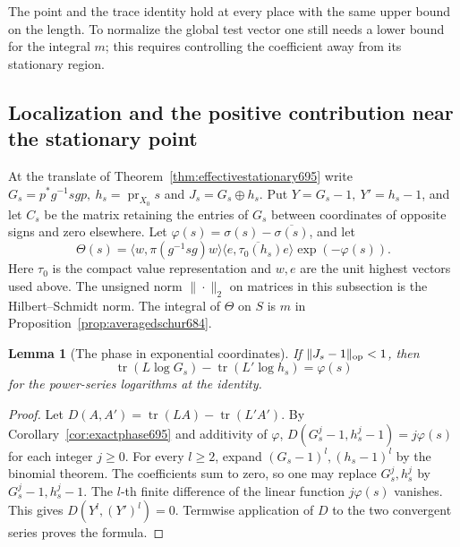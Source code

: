 \documentclass[a4paper,11pt]{article}
\newtheorem{lemma}[proposition]{Lemma}
\theoremstyle{definition}
\theoremstyle{remark}
\numberwithin{equation}{section}
\begin{document}
The point and the trace identity hold at every place with the
same upper bound on the length. To normalize the global test
vector one still needs a lower bound for the integral \(m\);
this requires controlling the coefficient away from its
stationary region.


\subsection{Localization and the positive contribution near the stationary point}
\label{sec:positivecore696}

At the translate of Theorem~\ref{thm:effectivestationary695}
write \(G_s=p^*g^{-1}sgp,\ h_s=\operatorname{pr}_{X_0}s\) and
\(J_s=G_s\oplus h_s\). Put \(Y=G_s-1,\ Y'=h_s-1\), and let
\(C_s\) be the matrix retaining the entries of \(G_s\)
between coordinates of opposite signs and zero elsewhere.
Let \(\varphi(s)=\sigma(s)-\overline{\sigma(s)}\), and let
\[
 \Theta(s)=\langle w,\pi(g^{-1}sg)w\rangle
              \overline{\langle e,\tau_0(h_s)e\rangle}
                                  \exp(-\varphi(s)).
\]
Here \(\tau_0\) is the compact value representation and \(w,e\)
are the unit highest vectors used above. The unsigned norm
\(\|\cdot\|_2\) on matrices in this subsection is the
Hilbert--Schmidt norm. The integral of \(\Theta\) on \(S\)
is \(m\) in Proposition~\ref{prop:averagedschur684}.

\begin{lemma}[The phase in exponential coordinates]\leavevmode
\label{lem:logphase696}
If \(\|J_s-1\|_{\rm op}<1\), then
\[
          \operatorname{tr}(L\log G_s)-
          \operatorname{tr}(L'\log h_s)=\varphi(s)
\]
for the power-series logarithms at the identity.
\end{lemma}
\begin{proof}
Let \(D(A,A')=\operatorname{tr}(LA)-\operatorname{tr}(L'A')\).
By Corollary~\ref{cor:exactphase695} and additivity of
\(\varphi\), \(D(G_s^j-1,h_s^j-1)=j\varphi(s)\) for
each integer \(j\ge0\). For every \(l\ge2\), expand
\((G_s-1)^l,(h_s-1)^l\) by the binomial theorem. The
coefficients sum to zero, so one may replace \(G_s^j,h_s^j\)
by \(G_s^j-1,h_s^j-1\). The \(l\)-th finite difference of the
linear function \(j\varphi(s)\) vanishes. This gives
\(D(Y^l,(Y')^l)=0\). Termwise application of \(D\) to the
two convergent series proves the formula.
\end{proof}
\end{document}
